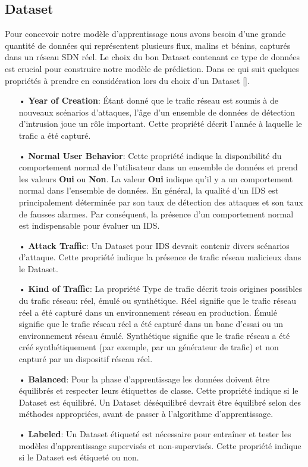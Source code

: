 \subsection{Dataset}
Pour concevoir notre modèle d'apprentissage nous avons besoin d'une grande quantité de données qui représentent plusieurs flux, malins et bénins, capturés dans un réseau SDN réel. Le choix du bon Dataset contenant ce type de données est crucial pour construire notre modèle de prédiction. Dans ce qui suit quelques propriétés à prendre en considération lors du choix d'un Dataset [\cite{15}].\\
\begin{itemize}
\item[•]\textbf{Year of Creation}: Étant donné que le trafic réseau est soumis à de nouveaux scénarios d’attaques, l’âge d’un ensemble de données de détection d’intrusion joue un rôle important. Cette propriété décrit l’année à laquelle le trafic a été capturé.\\
\item[•]\textbf{Normal User Behavior}: Cette propriété indique la disponibilité du comportement normal de l’utilisateur dans un ensemble de données et prend les valeurs \textbf{Oui} ou \textbf{Non}. La valeur \textbf{Oui} indique qu’il y a un comportement normal dans l’ensemble de données. En général, la qualité d’un IDS est principalement déterminée par son taux de détection des attaques et son taux de fausses alarmes. Par conséquent, la présence d’un comportement normal est indispensable pour évaluer un IDS.\\
\item[•]\textbf{Attack Traffic}: Un Dataset pour IDS devrait contenir divers scénarios d’attaque. Cette propriété indique la présence de trafic réseau malicieux dans le Dataset.\\
\item[•]\textbf{Kind of Traffic}: La propriété Type de trafic décrit trois origines possibles du trafic réseau: réel, émulé ou synthétique. Réel signifie que le trafic réseau réel a été capturé dans un environnement réseau en production. Émulé signifie que le trafic réseau réel a été capturé dans un banc d’essai ou un environnement réseau émulé. Synthétique signifie que le trafic réseau a été créé synthétiquement (par exemple, par un générateur de trafic) et non capturé par un dispositif réseau réel.\\
\item[•]\textbf{Balanced}: Pour la phase d'apprentissage les données doivent être équilibrés et respecter  leurs étiquettes de classe. Cette propriété indique si le Dataset est équilibré. Un Dataset déséquilibré devrait être équilibré selon des méthodes appropriées, avant de passer à l'algorithme d'apprentissage.\\
\item[•]\textbf{Labeled}: Un Dataset étiqueté est nécessaire pour entraîner et tester les modèles d’apprentissage supervisés et non-supervisés. Cette propriété indique si le Dataset est étiqueté ou non. 
\end{itemize}

